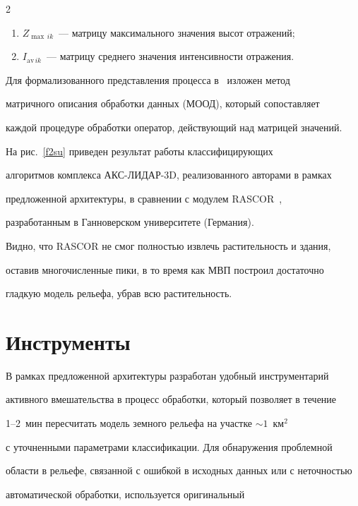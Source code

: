 \begin{multicols}{2}
\begin{enumerate}[(1)]
   \item $Z_{\max\,ik}$~--- матрицу максимального значения высот отражений;

   \item $I_{\mathrm{av}\,ik}$~--- матрицу среднего значения интенсивности отражения.

   \end{enumerate}

   

   Для формализованного представления процесса в~\cite{13su} изложен метод 

матричного описания обработки данных (МООД), который сопоставляет 

каждой процедуре обработки оператор, дейст\-ву\-ющий над матрицей значений.

   

   На рис.~\ref{f2su} приведен результат работы классифицирующих 

алгоритмов комплекса АКС-ЛИДАР-3D, реализованного авторами в рамках 

предложенной архитектуры, в сравнении с модулем \mbox{RASCOR}~\cite{14su}, 

разработанным в Ганноверском университете (Германия).

   

   Видно, что RASCOR не смог полностью извлечь растительность и здания, 

оставив многочисленные пики, в то время как МВП построил достаточно 

гладкую модель рельефа, убрав всю растительность.



\section{Инструменты}



   В рамках предложенной архитектуры разработан удобный инструментарий 

активного вмешательства в процесс обработки, который позволяет в течение 

   1--2~мин пересчитать модель земного рельефа на участке $\sim 1$~км$^2$ 

с уточненными параметрами классификации. Для обнаружения проб\-лем\-ной 

области в рельефе, связанной с ошибкой в исходных данных или с неточностью 

автоматической обработки, используется оригинальный 


\end{multicols}
